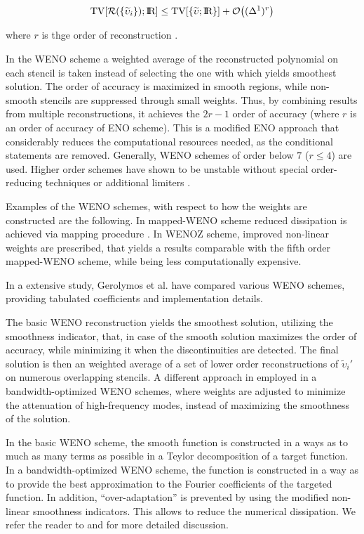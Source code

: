 \begin{equation}
\text{TV}[\mathcal{R}(\{\widetilde{\upsilon}_i\}); \text{I\!R}] \leq \text{TV}[\{\widetilde{\upsilon}; \text{I\!R}\}] + \mathcal{O}\big((\Delta^1)^r\big)
\end{equation}

where $r$ is thge order of reconstruction \cite{Harten:1987}. 

In the \ac{WENO} scheme a weighted average of the reconstructed polynomial on each stencil is taken instead of selecting the one with which yields smoothest solution. The order of accuracy is maximized in smooth regions, while non-smooth stencils are suppressed through small weights. Thus, by combining results from multiple reconstructions, it achieves the $2r-1$ order of accuracy (where $r$ is an order of accuracy of \ac{ENO} scheme). This is a modified \ac{ENO} approach that considerably reduces the computational resources needed, as the conditional statements are removed. Generally, \ac{WENO} schemes of order below $7$ ($r\leq 4$) are used.
Higher order schemes have shown to be unstable without special order-reducing techniques \citep{Gerolymos:2009,Tchekhovskoy:2007zn} or additional limiters \citep{Balsara:2000}.

Examples of the \ac{WENO} schemes, with respect to how the weights are constructed are the following. In mapped-\ac{WENO} scheme reduced dissipation is achieved via mapping procedure \citep{Henrick:2005}. In WENOZ scheme, improved non-linear weights are prescribed, that yields a results comparable with the fifth order mapped-\ac{WENO} scheme, while being less computationally expensive. 

In a extensive study, Gerolymos et al. \citep{Gerolymos:2009} have compared various \ac{WENO} schemes, providing tabulated coefficients and implementation details.

The basic \ac{WENO} reconstruction yields the smoothest solution, utilizing the smoothness indicator, that, in case of the smooth solution maximizes the order of accuracy, while minimizing it when the discontinuities are detected. The final solution is then an weighted average of a set of lower order reconstructions of $\widetilde{\upsilon}_i '$ on numerous overlapping stencils. 
A different approach in employed in a bandwidth-optimized \ac{WENO} schemes, where weights are adjusted to minimize the attenuation of high-frequency modes, instead of maximizing the smoothness of the solution. 

In the basic \ac{WENO} scheme, the smooth function is constructed in a ways as to much as many terms as possible in a Teylor decomposition of a target function. In a bandwidth-optimized \ac{WENO} scheme, the function is constructed in a way as to provide the best approximation to the Fourier coefficients of the targeted function. 
In addition, ``over-adaptation'' is prevented by using the modified non-linear smoothness indicators. This allows to reduce the numerical dissipation. We refer the reader to \citep{Martin:2006} and \citep{Taylor:2007} for more detailed discussion. 

